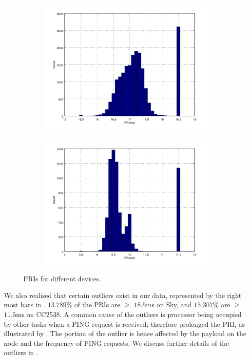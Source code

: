\begin{figure}[ht!]
	\begin{subfigure}{0.45\linewidth}
		\includegraphics[width=\linewidth]{fig/helloworld_sky.png}
	\end{subfigure}
	\begin{subfigure}{0.45\linewidth}
		\includegraphics[width=\linewidth]{fig/helloworld_cc2538.png}
	\end{subfigure}
	\caption{PRIs for different devices. \label{PRIs}}
\end{figure}

We also realised that certain outliers exist in our data, represented by the right most bars in . $13.789$\%  of the PRIs are $\geq$ $18.5$ms on Sky, and $15.307$\% are $\geq$ $11.5$ms on CC2538. A common cause of the outliers is processor being occupied by other tasks when a PING request is received; therefore prolonged the PRI, as illustrated by . The portion of the outlier is hence affected by the payload on the node and the frequency of PING requests. We discuss further details of the outliers in .

